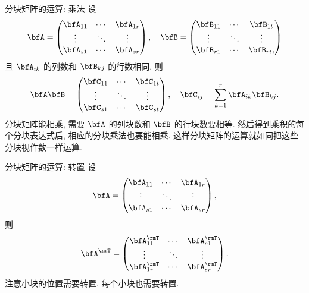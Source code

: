 \begin{frame}{分块矩阵的运算: 乘法}
	\onslide<+->
	设
	\[\bfA=\begin{pmatrix}
		\bfA_{11}&\cdots&\bfA_{1r}\\
		\vdots&\ddots&\vdots\\
		\bfA_{s1}&\cdots&\bfA_{sr}
	\end{pmatrix},\quad
	\bfB=\begin{pmatrix}
		\bfB_{11}&\cdots&\bfB_{1t}\\
		\vdots&\ddots&\vdots\\
		\bfB_{r1}&\cdots&\bfB_{rt},
	\end{pmatrix}\]
	且 $\bfA_{ik}$ 的列数和 $\bfB_{kj}$ 的行数相同, 则
	\[\bfA\bfB=\begin{pmatrix}
		\bfC_{11}&\cdots&\bfC_{1t}\\
		\vdots&\ddots&\vdots\\
		\bfC_{s1}&\cdots&\bfC_{st}
	\end{pmatrix},\quad\bfC_{ij}=\sum_{k=1}^r \bfA_{ik}\bfB_{kj}.\]
	\onslide<+->
	分块矩阵能相乘, 需要 $\bfA$ 的列块数和 $\bfB$ 的行块数要相等.
	\onslide<+->
	然后得到乘积的每个分块表达式后, 相应的分块乘法也要能相乘.
	\onslide<+->
	这样分块矩阵的运算就如同把这些分块视作数一样运算.
\end{frame}


\begin{frame}{分块矩阵的运算: 转置}
	\onslide<+->
	设
	\[\bfA=\begin{pmatrix}
		\bfA_{11}&\cdots&\bfA_{1r}\\
		\vdots&\ddots&\vdots\\
		\bfA_{s1}&\cdots&\bfA_{sr}
	\end{pmatrix},\]
	则
	\[\bfA^\rmT=\begin{pmatrix}
		\bfA_{11}^\rmT&\cdots&\bfA_{s1}^\rmT\\
		\vdots&\ddots&\vdots\\
		\bfA_{1r}^\rmT&\cdots&\bfA_{sr}^\rmT
	\end{pmatrix}.\]
	\onslide<+->
	注意小块的位置需要转置, 每个小块也需要转置.
\end{frame}


